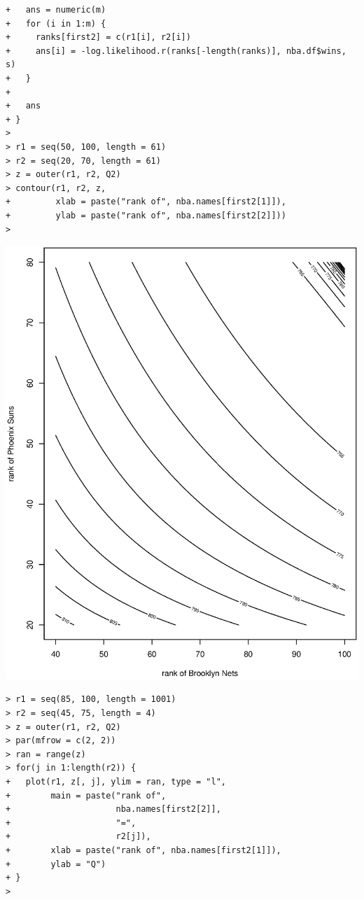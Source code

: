 \documentclass[11pt]{report}
\theoremstyle{definition}
\theoremstyle{remark}
\begin{document}
\begin{enumerate}
\begin{enumerate}
\begin{verbatim}
+   ans = numeric(m)
+   for (i in 1:m) {
+     ranks[first2] = c(r1[i], r2[i])
+     ans[i] = -log.likelihood.r(ranks[-length(ranks)], nba.df$wins, s)
+   }
+   
+   ans
+ }
> 
> r1 = seq(50, 100, length = 61)
> r2 = seq(20, 70, length = 61)
> z = outer(r1, r2, Q2)
> contour(r1, r2, z,
+         xlab = paste("rank of", nba.names[first2[1]]),
+         ylab = paste("rank of", nba.names[first2[2]]))
> \end{verbatim}
    \includegraphics[width=\textwidth]{a2_contour.eps}
    \begin{verbatim}> r1 = seq(85, 100, length = 1001)
> r2 = seq(45, 75, length = 4)
> z = outer(r1, r2, Q2)
> par(mfrow = c(2, 2))
> ran = range(z)
> for(j in 1:length(r2)) {
+   plot(r1, z[, j], ylim = ran, type = "l",
+        main = paste("rank of", 
+                     nba.names[first2[2]], 
+                     "=", 
+                     r2[j]),
+        xlab = paste("rank of", nba.names[first2[1]]),
+        ylab = "Q")
+ }
> \end{verbatim}

\end{enumerate}
\end{enumerate}
\end{document}
